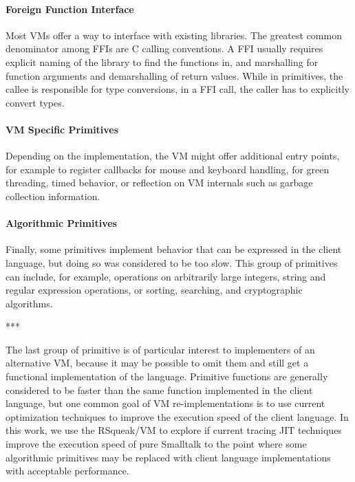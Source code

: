 \documentclass[
10pt,          %
]{sigplanconf}
\begin{document}
\paragraph{Foreign Function Interface}
Most \acp{VM} offer a way to interface with existing libraries. The greatest
common denominator among \acp{FFI} are C calling conventions. A \ac{FFI}
usually requires explicit naming of the library to find the functions in, and
marshalling for function arguments and demarshalling of return values. While in
primitives, the callee is responsible for type conversions, in a \ac{FFI} call,
the caller has to explicitly convert types.

\paragraph{VM Specific Primitives}
Depending on the implementation, the \ac{VM} might offer additional entry
points, for example to register callbacks for mouse and keyboard
handling, for green threading, timed behavior, or reflection on \ac{VM}
internals such as garbage collection information.

\paragraph{Algorithmic Primitives}
Finally, some primitives implement behavior that can be expressed in
the client language, but doing so was considered to be too slow. This
group of primitives can include, for example, operations on
arbitrarily large integers, string and regular expression operations,
or sorting, searching, and cryptographic algorithms.
\begin{center}
***  
\end{center}

The last group of primitive is of particular interest to implementers
of an alternative \ac{VM}, because it may be possible to omit them and
still get a functional implementation of the language. Primitive
functions are generally considered to be faster than the same function
implemented in the client language, but one common goal of \ac{VM}
re-implementations is to use current optimization techniques to
improve the execution speed of the client language. In this work, we
use the RSqueak/VM to explore if current tracing \ac{JIT} techniques
improve the execution speed of pure Smalltalk to the point where some
algorithmic primitives may be replaced with client language
implementations with acceptable performance.
\end{document}
